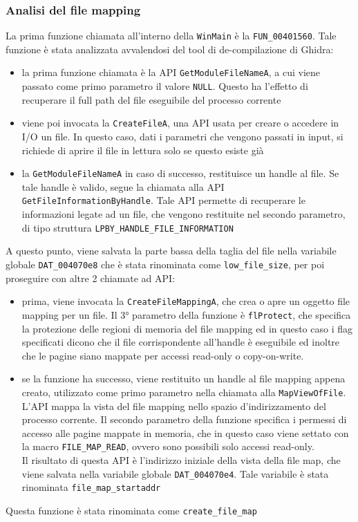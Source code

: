 \documentclass{article}
\begin{document}
\subsubsection{Analisi del file mapping}
La prima funzione chiamata all'interno della \texttt{WinMain} è la \texttt{FUN\_00401560}. Tale funzione è stata analizzata avvalendosi del tool di de-compilazione di Ghidra:
\begin{itemize}
	\item la prima funzione chiamata è la API \texttt{GetModuleFileNameA}, a cui viene passato come primo parametro il valore \texttt{NULL}. Questo ha l'effetto di recuperare il full path del file eseguibile del processo corrente
	\item viene poi invocata la \texttt{CreateFileA}, una API usata per creare o accedere in I/O un file. In questo caso, dati i parametri che vengono passati in input, si richiede di aprire il file in lettura solo se questo esiste già
	\item la \texttt{GetModuleFileNameA} in caso di successo, restituisce un handle al file. Se tale handle è valido, segue la chiamata alla API \texttt{GetFileInformationByHandle}. Tale API permette di recuperare le informazioni legate ad un file, che vengono restituite nel secondo parametro, di tipo struttura \texttt{LPBY\_HANDLE\_FILE\_INFORMATION}
\end{itemize}
A questo punto, viene salvata la parte bassa della taglia del file nella variabile globale \texttt{DAT\_004070e8} che è stata rinominata come \texttt{low\_file\_size}, per poi proseguire con altre 2 chiamate ad API:
\begin{itemize}
	\item prima, viene invocata la \texttt{CreateFileMappingA}, che crea o apre un oggetto file mapping per un file. Il 3° parametro della funzione è \texttt{flProtect}, che specifica la protezione delle regioni di memoria del file mapping ed in questo caso i flag specificati dicono che il file corrispondente all'handle è eseguibile ed inoltre che le pagine siano mappate per accessi read-only o copy-on-write.
	\item se la funzione ha successo, viene restituito un handle al file mapping appena creato, utilizzato come primo parametro nella chiamata alla \texttt{MapViewOfFile}. L'API mappa la vista del file mapping nello spazio d'indirizzamento del processo corrente. Il secondo parametro della funzione specifica i permessi di accesso alle pagine mappate in memoria, che in questo caso viene settato con la macro \texttt{FILE\_MAP\_READ}, ovvero sono possibili solo accessi read-only.\\Il risultato di questa API è l'indirizzo iniziale della vista della file map, che viene salvata nella variabile globale \texttt{DAT\_004070e4}. Tale variabile è stata rinominata \texttt{file\_map\_startaddr}
\end{itemize}
Questa funzione è stata rinominata come \texttt{create\_file\_map}
\end{document}
